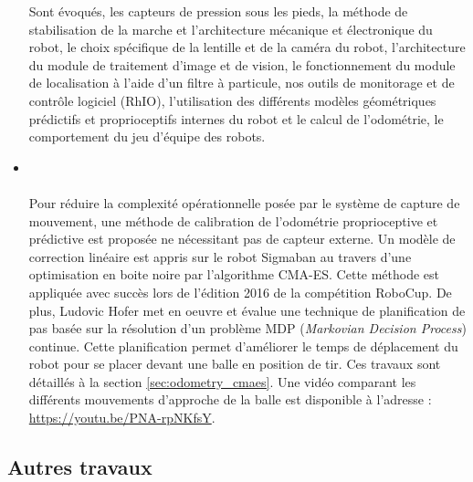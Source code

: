 \begin{itemize}
        Sont évoqués, les capteurs de pression sous les pieds, la méthode de stabilisation 
        de la marche et l'architecture mécanique et électronique du robot, le choix spécifique de
        la lentille et de la caméra du robot, l'architecture du module de traitement d'image 
        et de vision, le fonctionnement du module de localisation à l'aide d'un filtre à particule, 
        nos outils de monitorage et de contrôle logiciel (RhIO), l'utilisation des différents 
        modèles géométriques prédictifs et proprioceptifs internes du robot 
        et le calcul de l'odométrie, 
        le comportement du jeu d'équipe des robots.\\
    \item \footnotesize{}\normalsize\leavevmode\\\\
        Pour réduire la complexité opérationnelle posée par le système de capture de mouvement,
        une méthode de calibration de l'odométrie proprioceptive et prédictive est proposée
        ne nécessitant pas de capteur externe. Un modèle de correction linéaire est appris
        sur le robot Sigmaban au travers d'une optimisation en boite noire par l'algorithme CMA-ES.
        Cette méthode est appliquée avec succès lors de l'édition 2016 de la compétition RoboCup.
        De plus, Ludovic Hofer met en oeuvre et évalue une technique de planification de pas
        basée sur la résolution d'un problème MDP (\textit{Markovian Decision Process}) continue.
        Cette planification permet d'améliorer le temps de déplacement du robot pour se 
        placer devant une balle en position de tir.
        Ces travaux sont détaillés à la section \ref{sec:odometry_cmaes}.
        Une vidéo comparant les différents mouvements d'approche de la balle 
        est disponible à l'adresse : \url{https://youtu.be/PNA-rpNKfsY}.\\
\end{itemize}

\subsection{Autres travaux\label{sec:other_works}}

